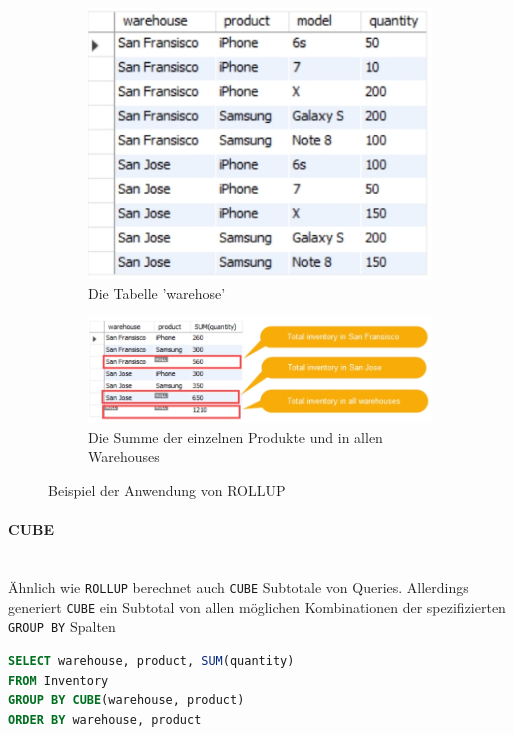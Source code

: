 \documentclass[a4paper, 11pt, nofootinbib]{article}
\newcommand{\code}[1]{\texttt{#1}}
\begin{document}
\begin{figure}[htb]
	\centering
	\begin{subfigure}{.5\textwidth}
		\centering
		\includegraphics[keepaspectratio=true, width=.8\linewidth]{warehouse_table.jpg}
		\caption{Die Tabelle 'warehose'}
		\label{fig:sub1}
	\end{subfigure}%
	\begin{subfigure}{.5\textwidth}
		\centering
		\includegraphics[width=1\linewidth]{rollup.jpg}
		\caption{Die Summe der einzelnen Produkte und in allen Warehouses}
		\label{fig:sub2}
	\end{subfigure}
	\caption{Beispiel der Anwendung von ROLLUP}
	\label{fig:rollup}
\end{figure}

\paragraph{CUBE}\mbox{}\\
Ähnlich wie \code{ROLLUP} berechnet auch \code{CUBE} Subtotale von Queries. Allerdings generiert \code{CUBE} ein Subtotal von allen möglichen Kombinationen der spezifizierten \code{GROUP BY} Spalten

\begin{lstlisting}[language=sql, captionpos=b, caption={Beispiel der Nutzung von CUBE}]
SELECT warehouse, product, SUM(quantity)
FROM Inventory
GROUP BY CUBE(warehouse, product)
ORDER BY warehouse, product
\end{lstlisting}
\end{document}
